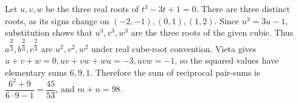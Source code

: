 Let $u,v,w$ be the three real roots of $t^3-3t+1=0$. There are three distinct roots, as its signs change on $(-2,-1),(0,1),(1,2)$. Since $u^3=3u-1$, substitution shows that $u^3,v^3,w^3$ are the three roots of the given cubic. Thus $a^{\dfrac{2}{3}} , b^{\dfrac{2}{3}} , c^{\dfrac{2}{3}}$ are $u^2,v^2,w^2$ under real cube-root convention. Vieta gives $u+v+w=0,uv+vw+wu=-3,uvw=-1$, so the squared values have elementary sums $6,9,1$. Therefore the sum of reciprocal pair-sums is $\dfrac{6^2+9}{6\cdot9-1} = \dfrac{45}{53}$, and $\boxed{m+n=98}$.

